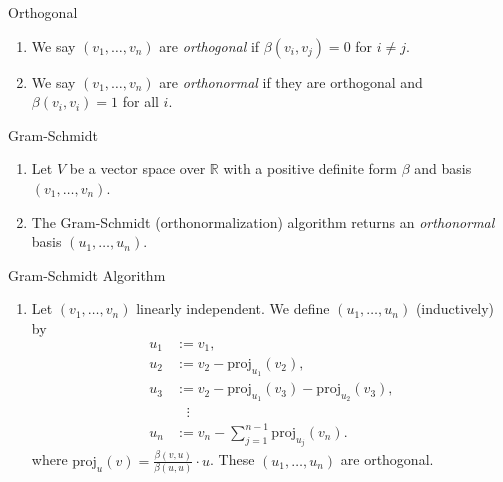 \documentclass{beamer}
\newcommand{\R}{\mathbb{R}}
\newcommand{\proj}{\text{proj}}
\begin{document}
\begin{frame}{Orthogonal}
\begin{enumerate}
\item We say $(v_1, \dots, v_n)$ are \textit{orthogonal} if $\beta(v_i, v_j)=0$ for $i \neq j$. 
\item We say $(v_1, \dots, v_n)$ are \textit{orthonormal} if they are orthogonal and $\beta(v_i,v_i)=1$ for all $i$. 
\end{enumerate}

\end{frame}




    






\begin{frame}{Gram-Schmidt}

\begin{enumerate}
    \item Let $V$ be a vector space over $\R$ with a positive definite form $\beta$ and basis $(v_1, \dots, v_n)$. 
    \item The Gram-Schmidt (orthonormalization) algorithm returns an \textit{orthonormal} basis $(u_1, \dots, u_n)$.     
\end{enumerate}

\end{frame}

\begin{frame}{Gram-Schmidt Algorithm}

\begin{enumerate}
\item Let $(v_1, \dots, v_n)$ linearly independent. We define $(u_1, \dots, u_n)$ (inductively) by
\begin{align*}
u_1&:=v_1,\\
u_2&:=v_2-\proj_{u_1}(v_2),\\
u_3&:=v_2-\proj_{u_1}(v_3)-\proj_{u_2}(v_3),\\
&\,\,\,\,\,\vdots\\
u_n &:= v_n-\sum_{j=1}^{n-1} \proj_{u_j}(v_n).
\end{align*}
where $\proj_u(v) = \frac{\beta(v,u)}{\beta(u,u)} \cdot u$. These $(u_1, \dots, u_n)$ are orthogonal. 
\end{enumerate}
\end{frame}
\end{document}
